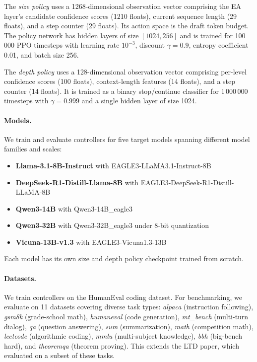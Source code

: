 \documentclass[letterpaper,twocolumn,10pt]{article}
\newenvironment{denseitemize}{
\begin{itemize}[topsep=2.5pt, partopsep=0pt, leftmargin=1.5em]
  \setlength{\itemsep}{2.5pt}
  \setlength{\parskip}{0pt}
  \setlength{\parsep}{0pt}
}{\end{itemize}}
\begin{document}
The \emph{size policy} uses a 1268-dimensional observation vector comprising the EA layer's candidate confidence scores (1210 floats), current sequence length (29 floats), and a step counter (29 floats). Its action space is the draft token budget. The policy network has hidden layers of size $[1024, 256]$ and is trained for 100\,000 PPO timesteps with learning rate $10^{-3}$, discount $\gamma = 0.9$, entropy coefficient 0.01, and batch size 256.

The \emph{depth policy} uses a 128-dimensional observation vector comprising per-level confidence scores (100 floats), context-length features (14 floats), and a step counter (14 floats). It is trained as a binary stop/continue classifier for 1\,000\,000 timesteps with $\gamma = 0.999$ and a single hidden layer of size 1024.

\paragraph{Models.}
We train and evaluate controllers for five target models spanning different model families and scales:
\begin{denseitemize}
  \item \textbf{Llama-3.1-8B-Instruct} with EAGLE3-LLaMA3.1-Instruct-8B
  \item \textbf{DeepSeek-R1-Distill-Llama-8B} with EAGLE3-DeepSeek-R1-Distill-LLaMA-8B
  \item \textbf{Qwen3-14B} with Qwen3-14B\_eagle3
  \item \textbf{Qwen3-32B} with Qwen3-32B\_eagle3 under 8-bit quantization
  \item \textbf{Vicuna-13B-v1.3} with EAGLE3-Vicuna1.3-13B
\end{denseitemize}
Each model has its own size and depth policy checkpoint trained from scratch.

\paragraph{Datasets.}
We train controllers on the HumanEval coding dataset. For benchmarking, we evaluate on 11 datasets covering diverse task types: \textit{alpaca} (instruction following), \textit{gsm8k} (grade-school math), \textit{humaneval} (code generation), \textit{mt\_bench} (multi-turn dialog), \textit{qa} (question answering), \textit{sum} (summarization), \textit{math} (competition math), \textit{leetcode} (algorithmic coding), \textit{mmlu} (multi-subject knowledge), \textit{bbh} (big-bench hard), and \textit{theoremqa} (theorem proving). This extends the LTD paper, which evaluated on a subset of these tasks.
\end{document}

